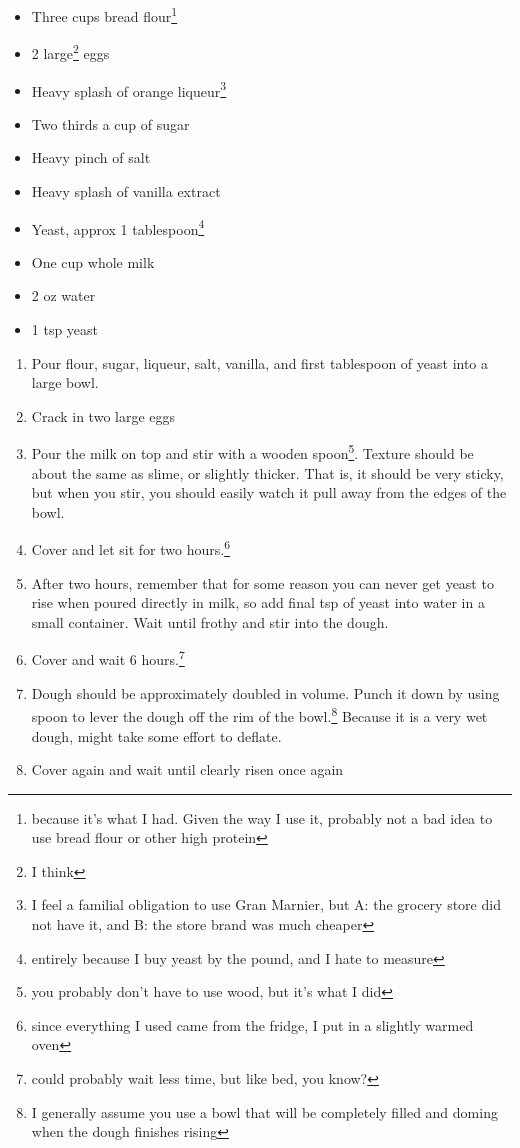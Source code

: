 \documentclass[12pt]{article}[titlepage]
\renewcommand{\,}{\textsuperscript{,}}
\begin{document}
\begin{itemize}  
\item Three cups bread flour\footnote{because it's what I had. Given the way I use it, probably not a bad idea to use bread flour or other high protein}  
\item 2 large\footnote{I think} eggs  
\item Heavy splash of orange liqueur\footnote{I feel a familial obligation to use Gran Marnier, but A: the grocery store did not have it, and B: the store brand was much cheaper}  
\item Two thirds a cup of sugar  
\item Heavy pinch of salt  
\item Heavy splash of vanilla extract  
\item Yeast, approx 1 tablespoon\footnote{entirely because I buy yeast by the pound, and I hate to measure}  
\item One cup whole milk  
\item 2 oz water  
\item 1 tsp yeast  
\end{itemize}

\begin{enumerate}  
\item Pour flour, sugar, liqueur, salt, vanilla, and first tablespoon of yeast into a large bowl.  
\item Crack in two large eggs  
\item Pour the milk on top and stir with a wooden spoon\footnote{you probably don't have to use wood, but it's what I did}. Texture should be about the same as slime, or slightly thicker. That is, it should be very sticky, but when you stir, you should easily watch it pull away from the edges of the bowl.  
\item Cover and let sit for two hours.\footnote{since everything I used came from the fridge, I put in a slightly warmed oven}  
\item After two hours, remember that for some reason you can never get yeast to rise when poured directly in milk, so add final tsp of yeast into water in a small container. Wait until frothy and stir into the dough.  
\item Cover and wait 6 hours.\footnote{could probably wait less time, but like bed, you know?}  
\item Dough should be approximately doubled in volume. Punch it down by using spoon to lever the dough off the rim of the bowl.\footnote{I generally assume you use a bowl that will be completely filled and doming when the dough finishes rising} Because it is a very wet dough, might take some effort to deflate.  
\item Cover again and wait until clearly risen once again  
\end{enumerate}
\end{document}
